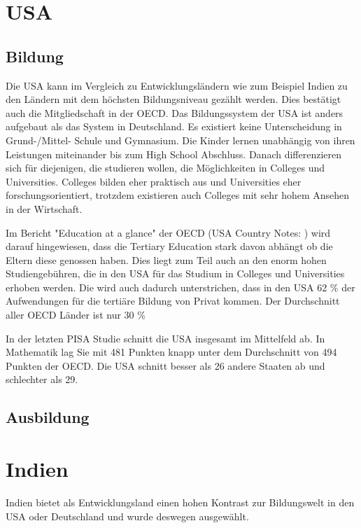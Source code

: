 \section{USA}
\subsection{Bildung}
Die USA kann im Vergleich zu Entwicklungsländern wie zum Beispiel Indien zu den Ländern mit dem höchsten Bildungsniveau gezählt werden. Dies bestätigt auch die Mitgliedschaft in der OECD. Das Bildungssystem der USA ist anders aufgebaut als das System in Deutschland. Es existiert keine Unterscheidung in Grund-/Mittel- Schule und Gymnasium. Die Kinder lernen unabhängig von ihren Leistungen miteinander bis zum High School Abschluss. Danach differenzieren sich für diejenigen, die studieren wollen, die Möglichkeiten in Colleges und Universities. Colleges bilden eher praktisch aus und Universities eher forschungsorientiert, trotzdem existieren auch Colleges mit sehr hohem Ansehen in der Wirtschaft. 

Im Bericht "Education at a glance" der OECD (USA Country Notes: \cite{oecd4}) wird darauf hingewiesen, dass die Tertiary Education stark davon abhängt ob die Eltern diese genossen haben. Dies liegt zum Teil auch an den enorm hohen Studiengebühren, die in den USA für das Studium in Colleges und Universities erhoben werden. Die wird auch dadurch unterstrichen, dass in den USA 62 \% der Aufwendungen für die tertiäre Bildung von Privat kommen. Der Durchschnitt aller OECD Länder ist nur 30 \%

In der letzten PISA Studie schnitt die USA insgesamt im Mittelfeld ab. In Mathematik lag Sie mit 481 Punkten knapp unter dem Durchschnitt von 494 Punkten der OECD. Die USA schnitt besser als 26 andere Staaten ab und schlechter als 29. \cite{pisa2}

\subsection{Ausbildung}

\section{Indien}
Indien bietet als Entwicklungsland einen hohen Kontrast zur Bildungswelt in den USA oder Deutschland und wurde deswegen ausgewählt.

